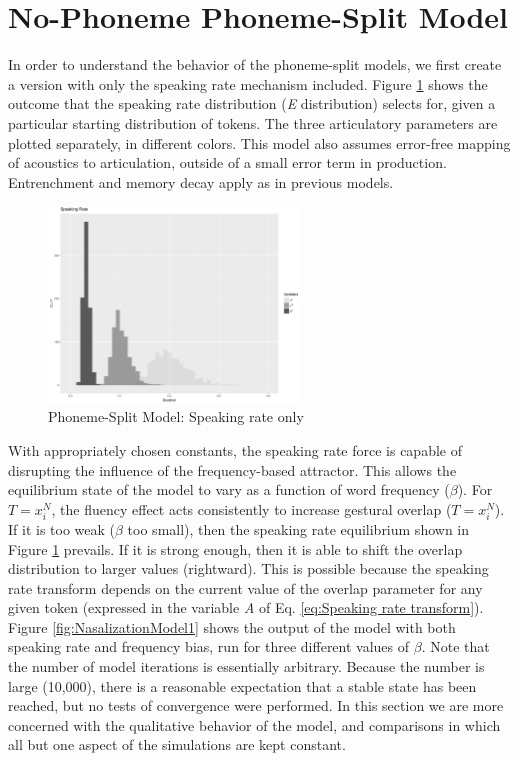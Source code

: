 \section{\label{sec:No-Phoneme-Phoneme-Split-Model}No-Phoneme Phoneme-Split Model}

In order to understand the behavior of the phoneme-split models, we
first create a version with only the speaking rate mechanism included.
Figure \ref{fig:SpeakingRateOnly} shows the outcome that the speaking
rate distribution (\emph{E} distribution) selects for, given a particular
starting distribution of tokens. The three articulatory parameters
are plotted separately, in different colors. This model also assumes
error-free mapping of acoustics to articulation, outside of a small
error term in production. Entrenchment and memory decay apply as in
previous models.

\begin{figure}[h]
\includegraphics[width=0.6\textwidth]{figures/SpeakingRateI10000.pdf}\caption{\label{fig:SpeakingRateOnly}Phoneme-Split Model: Speaking rate only}
\end{figure}

With appropriately chosen constants, the speaking rate force is capable
of disrupting the influence of the frequency-based attractor. This
allows the equilibrium state of the model to vary as a function of
word frequency ($\beta$). For $T=x_{i}^{N}$, the fluency effect
acts consistently to increase gestural overlap ($T=x_{i}^{N}$). If
it is too weak ($\beta$ too small), then the speaking rate equilibrium
shown in Figure \ref{fig:SpeakingRateOnly} prevails. If it is strong
enough, then it is able to shift the overlap distribution to larger
values (rightward). This is possible because the speaking rate transform
depends on the current value of the overlap parameter for any given
token (expressed in the variable \emph{A} of Eq. \ref{eq:Speaking rate transform}).
Figure \ref{fig:NasalizationModel1} shows the output of the model
with both speaking rate and frequency bias, run for three different
values of $\beta$. Note that the number of model iterations is essentially
arbitrary. Because the number is large (10,000), there is a reasonable
expectation that a stable state has been reached, but no tests of
convergence were performed. In this section we are more concerned
with the qualitative behavior of the model, and comparisons in which
all but one aspect of the simulations are kept constant.

